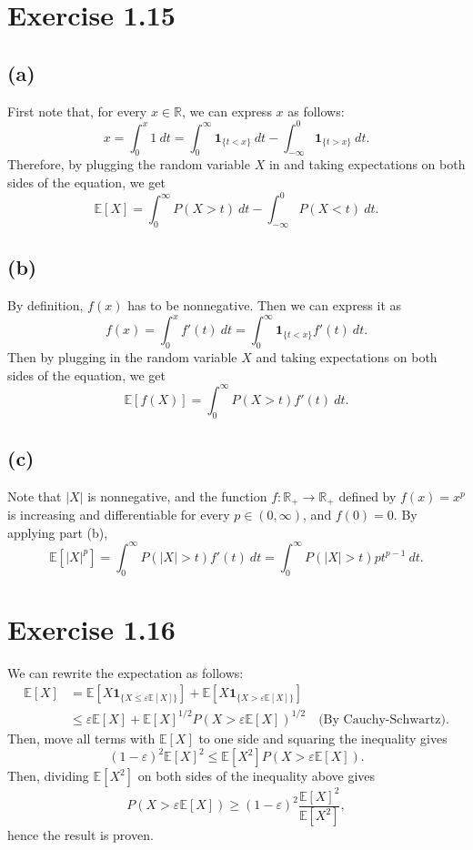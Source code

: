 \newpage
\section*{Exercise 1.15}
\subsection*{(a)}
First note that, for every $x \in \mathbb{R}$, we can express $x$ as follows: 
\[ x = \int_{0}^{x} 1 \ dt = \int_{0}^{\infty} \mathbf{1}_{\{ t < x \}} \ dt 
- \int_{-\infty}^{0} \mathbf{1}_{\{ t > x \}} \ dt. \]
Therefore, by plugging the random variable $X$ in and taking expectations on both sides of the equation, we get 
\[ \mathbb{E}\left[ X \right] = \int_{0}^{\infty} P(X > t) \ dt - \int_{-\infty}^{0} P(X < t) \ dt. \]

\subsection*{(b)}
By definition, $f(x)$ has to be nonnegative. Then we can express it as 
\[ f(x) = \int_{0}^{x} f'(t) \ dt = \int_{0}^{\infty} \mathbf{1}_{\{ t < x \}} f'(t) \ dt. \]
Then by plugging in the random variable $X$ and taking expectations on both sides of the equation, we get 
\[ \mathbb{E}\left[ f(X) \right] = \int_{0}^{\infty} P(X > t)f'(t) \ dt. \]

\subsection*{(c)}
Note that $|X|$ is nonnegative, and the function $f: \mathbb{R}_+ \to \mathbb{R}_+$ defined by $f(x) = x^p$ is 
increasing and differentiable for every $p \in (0, \infty)$, and $f(0) = 0$. By applying part (b), 
\[ \mathbb{E}\left[ |X|^p \right] = \int_{0}^{\infty} P(|X| > t)f'(t) \ dt 
= \int_{0}^{\infty} P(|X| > t)pt^{p - 1} \ dt. \]


\newpage
\section*{Exercise 1.16}
We can rewrite the expectation as follows:
\begin{align*}
	\mathbb{E}\left[ X \right] 
	&= \mathbb{E}\left[ X \mathbf{1}_{\{ X \leq \varepsilon \mathbb{E}\left[ X \right] \}} \right] 
	+ \mathbb{E}\left[ X \mathbf{1}_{\{ X > \varepsilon \mathbb{E}\left[ X \right] \}} \right] \\
	&\leq \varepsilon \mathbb{E}\left[ X \right] + \mathbb{E}\left[ X \right]^{1/2} 
	P(X > \varepsilon \mathbb{E}\left[ X \right])^{1/2} \quad \text{(By Cauchy-Schwartz)}.
\end{align*}
Then, move all terms with $\mathbb{E}\left[ X \right]$ to one side and squaring the inequality gives
\[ (1 - \varepsilon)^2 \mathbb{E}\left[ X \right]^2 \leq \mathbb{E}\left[ X^2 \right] 
P(X > \varepsilon \mathbb{E}\left[ X \right]). \]
Then, dividing $\mathbb{E}\left[ X^2 \right]$ on both sides of the inequality above gives 
\[ P(X > \varepsilon \mathbb{E}\left[ X \right]) \geq (1 - \varepsilon)^2 
\frac{\mathbb{E}\left[ X \right]^2}{\mathbb{E}\left[ X^2 \right]}, \]
hence the result is proven.


